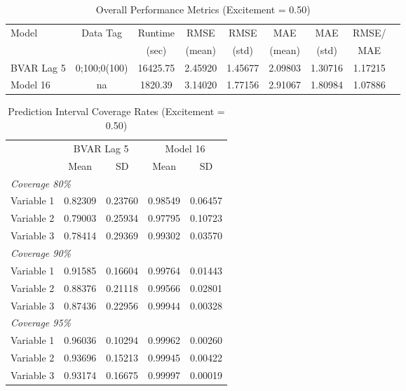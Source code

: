 
\begin{table}[htbp]
\centering
\caption{Overall Performance Metrics (Excitement = 0.50)}
\label{tab:overall_0p50}
\begin{tabular}{lcccccccc}
\toprule
Model & Data Tag & Runtime & RMSE & RMSE & MAE & MAE & RMSE/ \\
      &          & (sec)   & (mean) & (std) & (mean) & (std) & MAE \\
\midrule
BVAR Lag 5 & 0;100;0(100) & 16425.75 & 2.45920 & 1.45677 & 2.09803 & 1.30716 & 1.17215 \\
Model 16 & na & 1820.39 & 3.14020 & 1.77156 & 2.91067 & 1.80984 & 1.07886 \\
\bottomrule
\end{tabular}
\end{table}

\begin{table}[htbp]
\centering
\caption{Prediction Interval Coverage Rates (Excitement = 0.50)}
\label{tab:coverage_0p50}
\begin{tabular}{lcccc}
\toprule
 & \multicolumn{2}{c}{BVAR Lag 5} & \multicolumn{2}{c}{Model 16} \\
\cmidrule(lr){2-3} \cmidrule(lr){4-5}
 & Mean & SD & Mean & SD \\
\midrule
\multicolumn{5}{l}{\textit{Coverage 80\%}} \\
Variable 1 & 0.82309 & 0.23760 & 0.98549 & 0.06457 \\
Variable 2 & 0.79003 & 0.25934 & 0.97795 & 0.10723 \\
Variable 3 & 0.78414 & 0.29369 & 0.99302 & 0.03570 \\
\multicolumn{5}{l}{\textit{Coverage 90\%}} \\
Variable 1 & 0.91585 & 0.16604 & 0.99764 & 0.01443 \\
Variable 2 & 0.88376 & 0.21118 & 0.99566 & 0.02801 \\
Variable 3 & 0.87436 & 0.22956 & 0.99944 & 0.00328 \\
\multicolumn{5}{l}{\textit{Coverage 95\%}} \\
Variable 1 & 0.96036 & 0.10294 & 0.99962 & 0.00260 \\
Variable 2 & 0.93696 & 0.15213 & 0.99945 & 0.00422 \\
Variable 3 & 0.93174 & 0.16675 & 0.99997 & 0.00019 \\
\bottomrule
\end{tabular}
\end{table}

